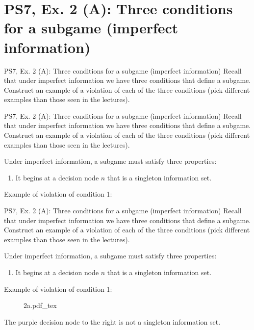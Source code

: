 \section{PS7, Ex. 2 (A): Three conditions for a subgame (imperfect information)}

\begin{frame}{PS7, Ex. 2 (A): Three conditions for a subgame (imperfect information)}
  Recall that under imperfect information we have three conditions that define a subgame. Construct an example of a violation of each of the three conditions (pick different examples than those seen in the lectures).
  \vfill\null
\end{frame}

\begin{frame}{PS7, Ex. 2 (A): Three conditions for a subgame (imperfect information)}
  Recall that under imperfect information we have three conditions that define a subgame. Construct an example of a violation of each of the three conditions (pick different examples than those seen in the lectures).
  \begin{multicols}{2}
    Under imperfect information, a subgame must satisfy three properties:
    \begin{enumerate}
      \item It begins at a decision node $n$ that is a singleton information set.
    \end{enumerate}
    \vfill\null\columnbreak
    Example of violation of condition 1:
    \vfill\null
  \end{multicols}
\end{frame}
\begin{frame}{PS7, Ex. 2 (A): Three conditions for a subgame (imperfect information)}
  Recall that under imperfect information we have three conditions that define a subgame. Construct an example of a violation of each of the three conditions (pick different examples than those seen in the lectures).
  \begin{multicols}{2}
    Under imperfect information, a subgame must satisfy three properties:
    \begin{enumerate}
      \item It begins at a decision node $n$ that is a singleton information set.
    \end{enumerate}
    \vfill\null\columnbreak
    Example of violation of condition 1:
    \begin{figure}[!h]
      \center
      \def\svgwidth{\columnwidth}
      {2a.pdf_tex}
    \end{figure}
    The purple decision node to the right is not a singleton information set.
    \vfill\null
  \end{multicols}
\end{frame}
